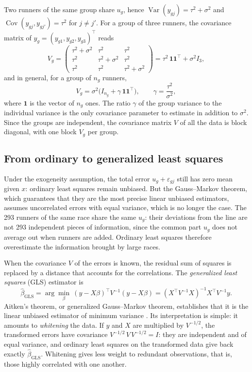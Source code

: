 \documentclass[11pt,a4paper]{article}
\DeclareMathOperator{\Var}{Var}
\DeclareMathOperator{\Cov}{Cov}
\begin{document}
Two runners of the same group share $u_g$, hence $\Var(y_{gj}) = \tau^2 + \sigma^2$ and
$\Cov(y_{gj}, y_{gj'}) = \tau^2$ for $j \neq j'$. For a group of three runners, the covariance matrix of
$y_g = (y_{g1}, y_{g2}, y_{g3})^\top$ reads
\[
V_g = \begin{pmatrix} \tau^2+\sigma^2 & \tau^2 & \tau^2 \\ \tau^2 & \tau^2+\sigma^2 & \tau^2 \\
\tau^2 & \tau^2 & \tau^2+\sigma^2 \end{pmatrix} = \tau^2\,\mathbf 1\mathbf 1^\top + \sigma^2 I_3 ,
\]
and in general, for a group of $n_g$ runners,
\begin{equation}\label{eq:Vg}
V_g = \sigma^2\big(I_{n_g} + \gamma\,\mathbf 1\mathbf 1^\top\big), \qquad \gamma = \frac{\tau^2}{\sigma^2},
\end{equation}
where $\mathbf 1$ is the vector of $n_g$ ones. The ratio $\gamma$ of the group variance to the individual variance is
the only covariance parameter to estimate in addition to $\sigma^2$. Since the groups are independent, the covariance
matrix $V$ of all the data is block diagonal, with one block $V_g$ per group.

\subsection{From ordinary to generalized least squares}\label{sec:gls}

Under the exogeneity assumption, the total error $u_g + \varepsilon_{gj}$ still has zero mean given $x$: ordinary least
squares remain unbiased. But the Gauss--Markov theorem, which guarantees that they are the most precise linear unbiased
estimators, assumes uncorrelated errors with equal variance, which is no longer the case. The 293 runners of the same
race share the same $u_g$: their deviations from the line are not 293 independent pieces of information, since the
common part $u_g$ does not average out when runners are added. Ordinary least squares therefore overestimate the
information brought by large races.

When the covariance $V$ of the errors is known, the residual sum of squares is replaced by a distance that accounts
for the correlations. The \emph{generalized least squares} (GLS) estimator is
\[
\hat\beta_{\text{GLS}} = \arg\min_\beta\ (y - X\beta)^\top V^{-1} (y - X\beta) = (X^\top V^{-1}X)^{-1}X^\top V^{-1}y .
\]
Aitken's theorem, or generalized Gauss--Markov theorem, establishes that it is the linear unbiased estimator of
minimum variance \citep{aitken1935}. Its interpretation is simple: it amounts to \emph{whitening} the data. If $y$ and
$X$ are multiplied by $V^{-1/2}$, the transformed errors have covariance $V^{-1/2}\,V\,V^{-1/2} = I$: they are
independent and of equal variance, and ordinary least squares on the transformed data give back exactly
$\hat\beta_{\text{GLS}}$. Whitening gives less weight to redundant observations, that is, those highly correlated with
one another.
\end{document}
